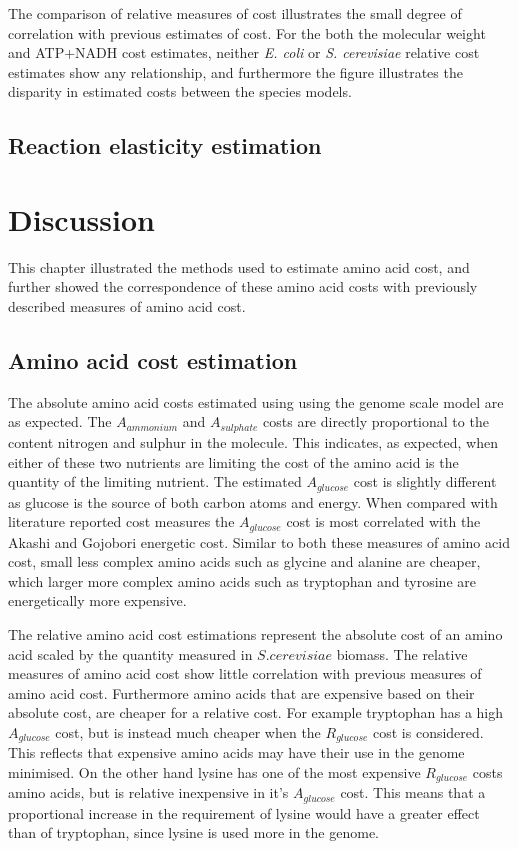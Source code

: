 The comparison of relative measures of cost illustrates the small degree of correlation with previous estimates of cost. For the both the molecular weight and ATP+NADH cost estimates, neither \emph{E. coli} or \emph{S. cerevisiae} relative cost estimates show any relationship, and furthermore the figure illustrates the disparity in estimated costs between the species models.

\subsection{Reaction elasticity estimation}

\section{Discussion}

This chapter illustrated the methods used to estimate amino acid cost, and further showed the correspondence of these amino acid costs with previously described measures of amino acid cost.

\subsection{Amino acid cost estimation}

The absolute amino acid costs estimated using using the genome scale model are as expected. The $A_{ammonium}$ and $A_{sulphate}$ costs are directly proportional to the content nitrogen and sulphur in the molecule. This indicates, as expected, when either of these two nutrients are limiting the cost of the amino acid is the quantity of the limiting nutrient. The estimated $A_{glucose}$ cost is slightly different as glucose is the source of both carbon atoms and energy. When compared with literature reported cost measures the $A_{glucose}$ cost is most correlated with the Akashi and Gojobori energetic cost. Similar to both these measures of amino acid cost, small less complex amino acids such as glycine and alanine are cheaper, which larger more complex amino acids such as tryptophan and tyrosine are energetically more expensive.

The relative amino acid cost estimations represent the absolute cost of an amino acid scaled by the quantity measured in $S. cerevisiae$ biomass. The relative measures of amino acid cost show little correlation with previous measures of amino acid cost. Furthermore amino acids that are expensive based on their absolute cost, are cheaper for a relative cost. For example tryptophan has a high $A_{glucose}$ cost, but is instead much cheaper when the $R_{glucose}$ cost is considered. This reflects that expensive amino acids may have their use in the genome minimised. On the other hand lysine has one of the most expensive $R_{glucose}$ costs amino acids, but is relative inexpensive in it's $A_{glucose}$ cost. This means that a proportional increase in the requirement of lysine would have a greater effect than of tryptophan, since lysine is used more in the genome.

